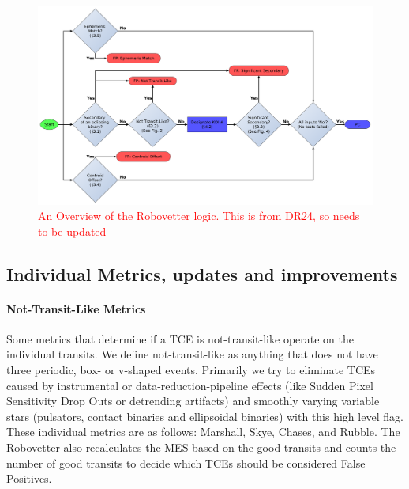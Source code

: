 \documentclass[onecolumn]{aastex6}
\newcommand\red{\textcolor{red}}
\begin{document}
\begin{figure}
\centering
\includegraphics[width=\linewidth]{RoboVetter-Diagram-V3-Overview.pdf}
\caption{\red{An Overview of the Robovetter logic. This is from DR24, so needs to be updated}}
\end{figure}

\subsection{Individual Metrics, updates and improvements}

\paragraph{Not-Transit-Like Metrics} 
Some metrics that determine if a TCE is not-transit-like operate on the individual transits. We define not-transit-like as anything that does not have three periodic, box- or v-shaped events. Primarily we try to eliminate TCEs caused by instrumental or data-reduction-pipeline effects (like Sudden Pixel Sensitivity Drop Outs or detrending artifacts) and smoothly varying variable stars (pulsators, contact binaries and ellipsoidal binaries) with this high level flag.   These individual metrics are as follows: Marshall, Skye, Chases, and Rubble. The Robovetter also recalculates the MES based on the good transits and counts the number of good transits to decide which TCEs should be considered False Positives. 


%
\end{document}
